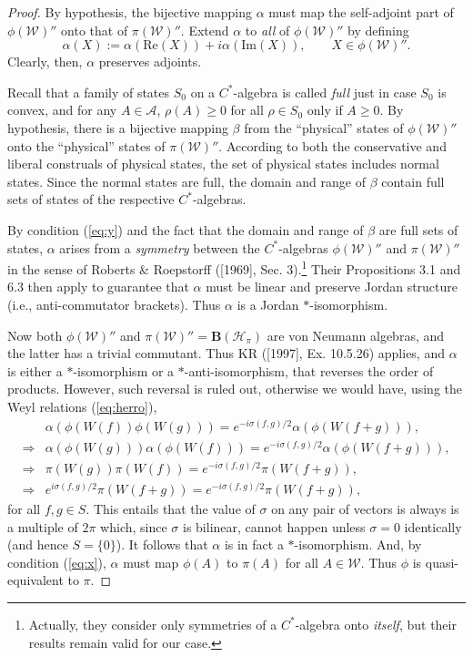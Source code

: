 \documentclass[12pt]{article}
\theoremstyle{remark}
\theoremstyle{definition}
\newcommand{\alg}[1]{\mathcal{#1}}
\newcommand{\hil}[1]{\mathcal{#1}}
\begin{document}
\begin{proof} By hypothesis, the bijective mapping 
  $\alpha$ must map the self-adjoint part of $\phi(\alg{W})''$ onto
  that of $\pi(\alg{W})''$.  Extend $\alpha$ to \emph{all} of
  $\phi(\alg{W})''$ by defining
\begin{equation}
\alpha(X):= 
\alpha(\mathrm{Re}(X))+i\alpha(\mathrm{Im}(X)),\qquad X\in\phi(\alg{W})''.  
\end{equation}
Clearly, then, $\alpha$ preserves adjoints.   

Recall that a family of states $S_{0}$ on a $C^{*}$-algebra is called
\emph{full} just in case $S_{0}$ is convex, and for any $A\in
\alg{A}$, $\rho (A)\geq 0$ for all $\rho \in S_{0}$ only if $A\geq 0$.
By hypothesis, there is a bijective mapping $\beta$ from the
``physical'' states of $\phi (\alg{W})''$ onto the ``physical'' states
of $\pi (\alg{W})''$.  According to both the conservative and liberal
construals of physical states, the set of physical states includes
normal states.  Since the normal states are full, the domain and range
of $\beta$ contain full sets of states of the respective
$C^{*}$-algebras.

By condition (\ref{eq:y}) and the fact that the domain and range of
$\beta$ are full sets of states, $\alpha$ arises from a
\emph{symmetry} between the $C^{*}$-algebras $\phi(\alg{W})''$ and
$\pi(\alg{W})''$ in the sense of Roberts \& Roepstorff ([1969], Sec.
3).\footnote{Actually, they consider only symmetries of a
  $C^{*}$-algebra onto \emph{itself}, but their results remain valid
  for our case.}  Their Propositions 3.1 and 6.3 then apply to
guarantee that $\alpha$ must be linear and preserve Jordan structure
(i.e., anti-commutator brackets).  Thus $\alpha$ is a Jordan
$*$-isomorphism.

Now both $\phi(\alg{W})''$ and
$\pi(\alg{W})''=\mathbf{B}(\hil{H}_{\pi})$ are von Neumann algebras,
and the latter has a trivial commutant.  Thus KR ([1997], Ex. 10.5.26)
applies, and $\alpha$ is either a $*$-isomorphism or a
$*$-anti-isomorphism, that reverses the order of products.  However,
such reversal is ruled out, otherwise we would have, using the Weyl
relations (\ref{eq:herro}),
\begin{eqnarray}
& \alpha(\phi(W(f))\phi(W(g))) = e^{-i\sigma (f,g)/2}\alpha(\phi(W(f+g))),\\
\Rightarrow & \alpha(\phi(W(g)))\alpha(\phi(W(f))) =
e^{-i\sigma (f,g)/2}\alpha(\phi(W(f+g))), \\
\Rightarrow & \pi(W(g))\pi(W(f)) = 
e^{-i\sigma (f,g)/2}\pi(W(f+g)), \\ 
\Rightarrow & e^{i\sigma (f,g)/2}\pi(W(f+g)) = 
e^{-i\sigma (f,g)/2}\pi(W(f+g)), 
\end{eqnarray} 
for all $f,g\in S$.  This entails that the value of $\sigma$ on any 
pair of vectors is always is a multiple of 
$2\pi$ which, since $\sigma$ is bilinear, cannot 
happen unless $\sigma=0$ identically (and hence $S=\{0\}$). It follows that $\alpha$ 
is in fact a $*$-isomorphism.  And, by condition (\ref{eq:x}), 
$\alpha$ must map $\phi(A)$ to $\pi(A)$ for all $A\in\alg{W}$.  Thus 
$\phi$ is quasi-equivalent to $\pi$. \end{proof}
\end{document}
